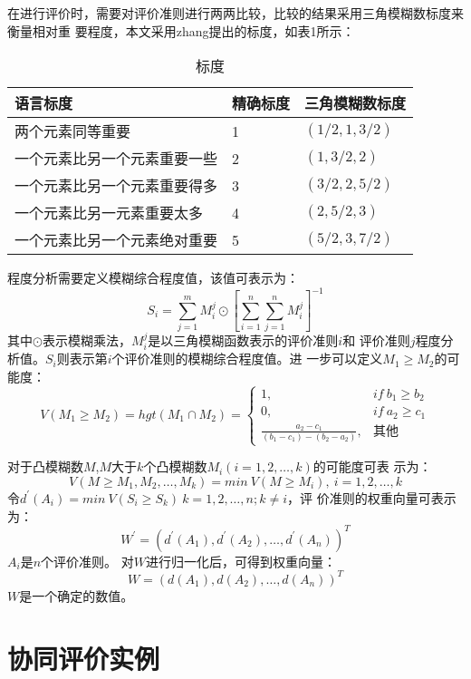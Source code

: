 \documentclass[adobefonts]{ctexart}
\begin{document}
在进行评价时，需要对评价准则进行两两比较，比较的结果采用三角模糊数标度来衡量相对重
要程度，本文采用zhang提出的标度，如表1所示：
\begin{table}
  \centering
 \caption{标度}
  \begin{tabular}{lll}
    语言标度&精确标度&三角模糊数标度\\\hline
    两个元素同等重要&1&$(1/2,1,3/2)$\\
    一个元素比另一个元素重要一些&2&$(1,3/2,2)$\\
    一个元素比另一个元素重要得多&3&$(3/2,2,5/2)$\\
    一个元素比另一元素重要太多&4&$(2,5/2,3)$\\
    一个元素比另一个元素绝对重要&5&$(5/2,3,7/2)$\\
  \end{tabular}
 
\end{table}
程度分析需要定义模糊综合程度值，该值可表示为：
\[
S_i=\sum^m_{j=1}M^j_{i}\odot
\left[\sum_{i=1}^n\sum_{j=1}^nM_{i}^j\right]^{-1}
\]
其中$\odot$表示模糊乘法，$M_{i}^j$是以三角模糊函数表示的评价准则$i$和
评价准则$j$程度分析值。$S_i$则表示第$i$个评价准则的模糊综合程度值。进
一步可以定义$M_1\geq M_2$的可能度：
\[V(M_1 \geq M_2)= hgt(M_1\cap M_2)=
\left\{
    \begin{array}{lll}
      1,& if \ b_1 \geq b_2\\
      0,& if \ a_2 \geq c_1\\
      \frac{a_2-c_1}{(b_1-c_1)-(b_2-a_2)},&\mbox{其他}
    \end{array}
  \right.
\]

对于凸模糊数$M$,$M$大于$k$个凸模糊数$M_i(i=1,2,\ldots,k)$的可能度可表
示为：
\[
V(M \geq M_1,M_2,\ldots,M_k)=min \ V(M \geq M_i),\ i=1,2,\ldots,k 
\]
令$d^{'} (A_i)=min \ V(S_i \geq S_k) \ k=1,2,\ldots,n; k \not= i$，评
价准则的权重向量可表示为：
\[
W^{'}=(d^{'}(A_1),d^{'}(A_2),\ldots,d^{'}(A_n))^T
\]
$A_i$是$n$个评价准则。
对$W$进行归一化后，可得到权重向量：
\[
W=(d(A_1),d(A_2),\ldots,d(A_n))^T
\]
$W$是一个确定的数值。

\section{协同评价实例}
\end{document}
